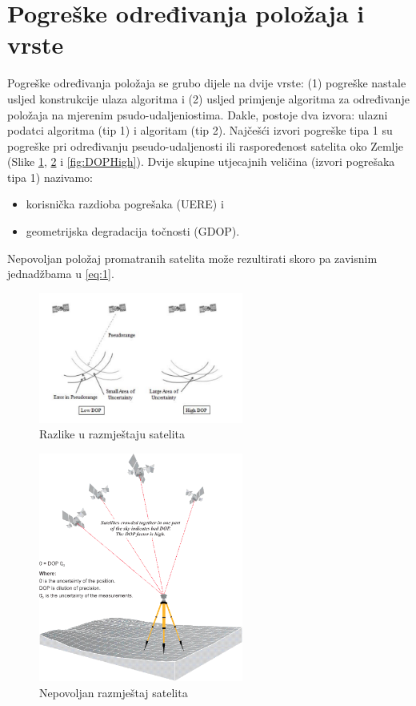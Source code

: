 \documentclass[a4paper,twoside,12pt]{memoir} %
\begin{document}
	\section{Pogreške određivanja položaja i vrste}\label{sec:pogreske}
	Pogreške određivanja položaja se grubo dijele na dvije vrste: (1)
	pogreške nastale usljed konstrukcije ulaza algoritma i
	(2) usljed primjenje algoritma za određivanje položaja na mjerenim psudo-udaljeniostima.
	Dakle, postoje dva izvora: ulazni podatci algoritma (tip 1) i algoritam (tip 2).
	Najčešći izvori pogreške tipa 1 su pogreške pri određivanju pseudo-udaljenosti
	ili raspoređenost satelita oko Zemlje (Slike \ref{fig:DOP}, \ref{fig:DOPLow} i \ref{fig:DOPHigh}).
	Dvije skupine utjecajnih veličina (izvori pogrešaka tipa 1) nazivamo:%
	\begin{itemize}
		\item korisnička razdioba pogrešaka (UERE) i 
		\item geometrijska degradacija točnosti (GDOP).
	\end{itemize}
	Nepovoljan položaj promatranih satelita može rezultirati skoro pa zavisnim jednadžbama
	u \ref{eq:1}.
	\begin{figure}[H]
		\centering
		\includegraphics[width=0.6\textwidth]{DOP}
		\caption{Razlike u razmještaju satelita}
		\label{fig:DOP}
	\end{figure}%
	\begin{figure}[H]
		\centering
		\includegraphics[width=0.6\textwidth]{DOPLow}
		\caption{Nepovoljan razmještaj satelita}
		\label{fig:DOPLow}
	\end{figure}%
\end{document}
